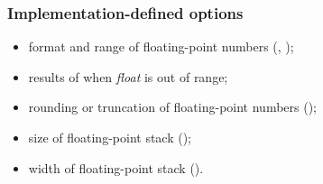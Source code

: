 \subsubsection{Implementation-defined options} %
\begin{itemize}
\item format and range of floating-point numbers
	(,
	 );
\item results of  when
	\emph{float} is out of range;
\item rounding or truncation of floating-point numbers
	();
\item size of floating-point stack
	();
\item width of floating-point stack
	().
\end{itemize}

